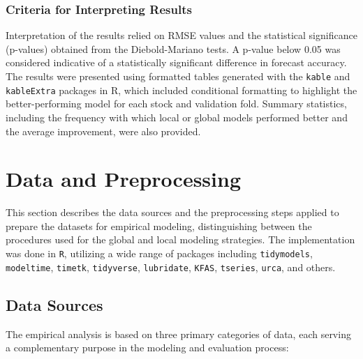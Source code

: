 \documentclass[12pt]{report}
\begin{document}
\subsubsection{Criteria for Interpreting Results}

Interpretation of the results relied on RMSE values and the statistical significance (p-values) obtained from the Diebold-Mariano tests. A p-value below 0.05 was considered indicative of a statistically significant difference in forecast accuracy. The results were presented using formatted tables generated with the \texttt{kable} and \texttt{kableExtra} packages in R, which included conditional formatting to highlight the better-performing model for each stock and validation fold. Summary statistics, including the frequency with which local or global models performed better and the average improvement, were also provided.



\newpage
\section{Data and Preprocessing}

This section describes the data sources and the preprocessing steps applied to prepare the datasets for empirical modeling, distinguishing between the procedures used for the global and local modeling strategies. The implementation was done in \texttt{R}, utilizing a wide range of packages including \texttt{tidymodels}, \texttt{modeltime}, \texttt{timetk}, \texttt{tidyverse}, \texttt{lubridate}, \texttt{KFAS}, \texttt{tseries}, \texttt{urca}, and others.

\subsection{Data Sources}
The empirical analysis is based on three primary categories of data, each serving a complementary purpose in the modeling and evaluation process:
\end{document}
